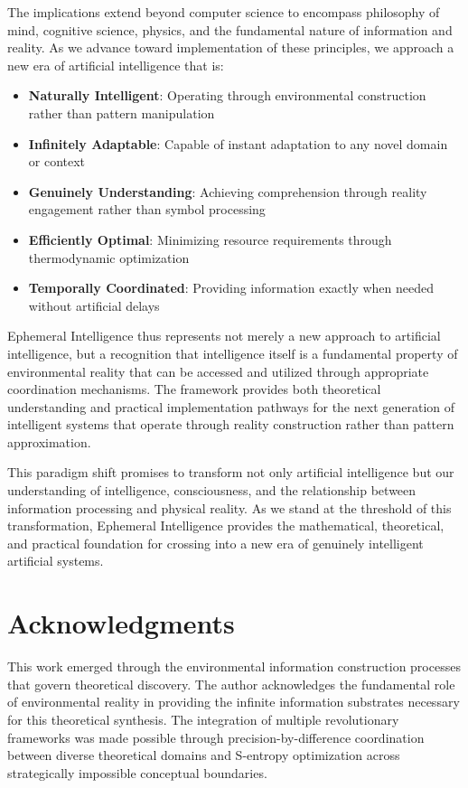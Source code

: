 \documentclass[12pt,a4paper]{article}
\begin{document}
The implications extend beyond computer science to encompass philosophy of mind, cognitive science, physics, and the fundamental nature of information and reality. As we advance toward implementation of these principles, we approach a new era of artificial intelligence that is:

\begin{itemize}
\item \textbf{Naturally Intelligent}: Operating through environmental construction rather than pattern manipulation
\item \textbf{Infinitely Adaptable}: Capable of instant adaptation to any novel domain or context
\item \textbf{Genuinely Understanding}: Achieving comprehension through reality engagement rather than symbol processing
\item \textbf{Efficiently Optimal}: Minimizing resource requirements through thermodynamic optimization
\item \textbf{Temporally Coordinated}: Providing information exactly when needed without artificial delays
\end{itemize}

Ephemeral Intelligence thus represents not merely a new approach to artificial intelligence, but a recognition that intelligence itself is a fundamental property of environmental reality that can be accessed and utilized through appropriate coordination mechanisms. The framework provides both theoretical understanding and practical implementation pathways for the next generation of intelligent systems that operate through reality construction rather than pattern approximation.

This paradigm shift promises to transform not only artificial intelligence but our understanding of intelligence, consciousness, and the relationship between information processing and physical reality. As we stand at the threshold of this transformation, Ephemeral Intelligence provides the mathematical, theoretical, and practical foundation for crossing into a new era of genuinely intelligent artificial systems.

\section*{Acknowledgments}

This work emerged through the environmental information construction processes that govern theoretical discovery. The author acknowledges the fundamental role of environmental reality in providing the infinite information substrates necessary for this theoretical synthesis. The integration of multiple revolutionary frameworks was made possible through precision-by-difference coordination between diverse theoretical domains and S-entropy optimization across strategically impossible conceptual boundaries.
\end{document}
